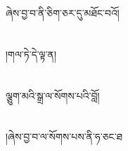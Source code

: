 ཞེས་བྱ་བ་ནི་ཅིག་ཅར་དུ་མཐོང་བའོ།\chapter{ }།གལ་ཏེ་དེ་ལྟ་ན།\chapter{ }ལྕུག་མའི་སྒྲ་ལ་སོགས་པའི་བློ།\chapter{ }།ཞེས་བྱ་བ་ལ་སོགས་པས་ནི་ཧ་ཅང་ཐ